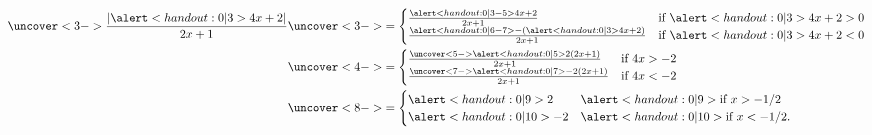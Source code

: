 \begin{frame}
\begin{example}
\begin{columns}
\begin{align*}
\uncover<3->{%
\frac{|\alert<handout:0| 3>{4x+2}|}{2x+1} %
}%
& \uncover<3->{%
 = \begin{cases}
\frac{\alert<handout:0| 3-5>{4x+2}}{2x+1} & \text{if $\alert<handout:0| 3>{4x+2} > 0$}\\
\frac{\alert<handout:0| 6-7>{-(\alert<handout:0| 3>{4x+2})}}{2x+1} & \text{if $\alert<handout:0| 3>{4x+2} < 0$}\\
\end{cases}
}\\%
& \uncover<4->{%
 = \begin{cases}
\frac{\uncover<5->{\alert<handout:0| 5>{2(2x+1)}}}{2x+1} & \text{if $4x > -2$}\\
\frac{\uncover<7->{\alert<handout:0| 7>{-2(2x+1)}}}{2x+1} & \text{if $4x < -2$}\\
\end{cases}
}\\%
& \uncover<8->{%
 = \begin{cases}
\alert<handout:0| 9>{2} & \alert<handout:0| 9>{\text{if $x > -1/2$}}\\
\alert<handout:0| 10>{-2} & \alert<handout:0| 10>{\text{if $x < -1/2$}}.\\
\end{cases}
}%
\end{align*}
\end{columns}
\end{example}
\end{frame}
